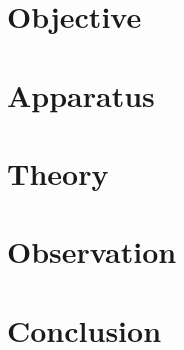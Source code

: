 \documentclass[a4paper]{article}
\begin{document}
 \newpage
{\hypersetup{linkcolor=black} %
\tableofcontents\thispagestyle{empty}}
\newpage
{}
\section{Objective}

\section{Apparatus}

\section{Theory}

\section{Observation}

\section{Conclusion}



\end{document}
